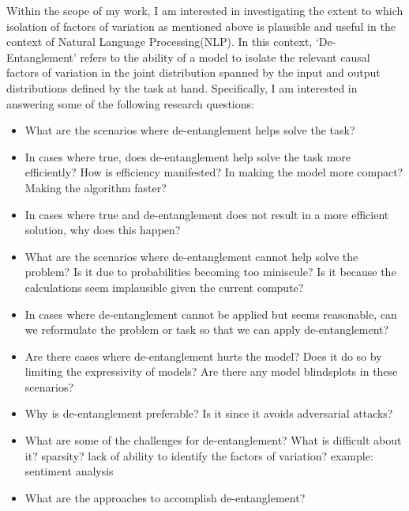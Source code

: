 Within the scope of my work, I am interested in investigating the extent to which  isolation of factors of variation as mentioned above is plausible and useful in the context of Natural Language Processing(NLP). In this context, `De-Entanglement' refers to the ability of a model to isolate the relevant causal factors of variation in the joint distribution spanned by the input and output distributions defined by the task at hand. Specifically, I am interested in answering some of the following research questions:
\begin{itemize}
    \item What are the scenarios where de-entanglement helps solve the task?
    \item In cases where true, does de-entanglement help solve the task more efficiently? How is efficiency manifested? In making the model more compact? Making the algorithm faster?
    \item In cases where true and de-entanglement does not result in a more efficient solution, why does this happen? 
    \item What are the scenarios where de-entanglement cannot help solve the problem? Is it due to probabilities becoming too miniscule? Is it because the calculations seem implausible given the current compute? 
    \item In cases where de-entanglement cannot be applied but seems reasonable, can we reformulate the problem or task so that we can apply de-entanglement? 
    \item Are there cases where de-entanglement hurts the model? Does it do so by limiting the expressivity of models? Are there any model blindsplots in these scenarios? 
    \item Why is de-entanglement preferable? Is it since it avoids adversarial attacks?
    \item What are some of the challenges for de-entanglement? What is difficult about it? sparsity? lack of ability to identify the factors of variation? example: sentiment analysis
    \item What are the approaches to accomplish de-entanglement? 
    
\end{itemize}




